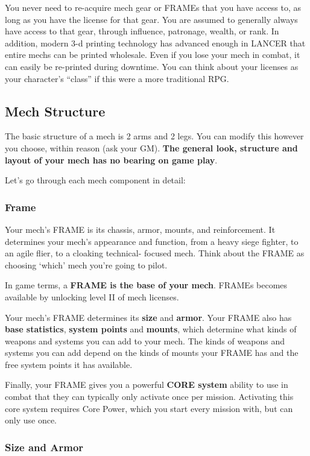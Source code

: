 You never need to re-acquire mech gear or FRAMEs that you have access to, as long as you have the license for that gear. You are assumed to generally always have access to that gear, through influence, patronage, wealth, or rank. In addition, modern 3-d printing technology has advanced enough in LANCER that entire mechs can be printed wholesale. Even if you lose your mech in combat, it can easily be re-printed during downtime. You can think about your licenses as your character’s ``class'' if this were a more traditional RPG.

\subsection{Mech Structure}

The basic structure of a mech is 2 arms and 2 legs. You can modify this however you choose, within reason (ask your GM). \textbf{The general look, structure and layout of your mech has no bearing on game play}. 

Let’s go through each mech component in detail:
\subsubsection{Frame}

Your mech’s FRAME is its chassis, armor, mounts, and reinforcement. It determines your mech’s appearance and function, from a heavy siege fighter, to an agile flier, to a cloaking technical- focused mech. Think about the FRAME as choosing `which' mech you’re going to pilot. 

In game terms, a \textbf{FRAME is the base of your mech}. FRAMEs becomes available by unlocking level II of mech licenses. 

Your mech’s FRAME determines its \textbf{size} and \textbf{armor}. Your FRAME also has \textbf{base statistics}, \textbf{system points} and \textbf{mounts}, which determine what kinds of weapons and systems you can add to your mech. The kinds of weapons and systems you can add depend on the kinds of mounts your FRAME has and the free system points it has available. 

Finally, your FRAME gives you a powerful \textbf{CORE system} ability to use in combat that they can typically only activate once per mission. Activating this core system requires Core Power, which you start every mission with, but can only use once.

\subsubsection{Size and Armor}

